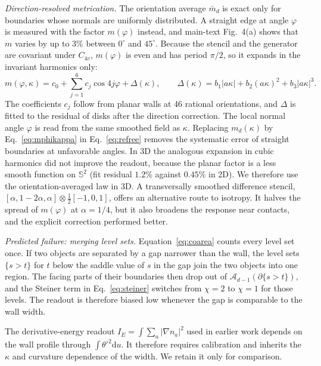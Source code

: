 \documentclass[11pt,a4paper]{article}
\newcommand{\dd}{\mathrm{d}}
\newcommand{\Sn}{\mathbb S}
\begin{document}
\emph{Direction-resolved metrication.} The orientation average $\bar m_d$ is exact only for boundaries whose normals are uniformly distributed. A straight edge at angle $\varphi$ is measured with the factor $m(\varphi)$ instead, and main-text Fig.~4(a) shows that $m$ varies by up to 3\% between $0^\circ$ and $45^\circ$. Because the stencil and the generator are covariant under $C_{4v}$, $m(\varphi)$ is even and has period $\pi/2$, so it expands in the invariant harmonics only:
\begin{equation}
 m(\varphi,\kappa)=c_0+\sum_{j=1}^{6}c_j\cos4j\varphi+\Delta(\kappa),\qquad \Delta(\kappa)=b_1|a\kappa|+b_2(a\kappa)^2+b_3|a\kappa|^3 .
 \label{eq:mphikappa}
\end{equation}
The coefficients $c_j$ follow from planar walls at 46 rational orientations, and $\Delta$ is fitted to the residual of disks after the direction correction. The local normal angle $\varphi$ is read from the same smoothed field as $\kappa$. Replacing $m_d(\kappa)$ by Eq.~\eqref{eq:mphikappa} in Eq.~\eqref{eq:refree} removes the systematic error of straight boundaries at unfavorable angles. In 3D the analogous expansion in cubic harmonics did not improve the readout, because the planar factor is a less smooth function on $\Sn^2$ (fit residual $1.2\%$ against $0.45\%$ in 2D). We therefore use the orientation-averaged law in 3D. A transversally smoothed difference stencil, $[\alpha,1-2\alpha,\alpha]\otimes\tfrac12[-1,0,1]$, offers an alternative route to isotropy. It halves the spread of $m(\varphi)$ at $\alpha=1/4$, but it also broadens the response near contacts, and the explicit correction performed better.

\emph{Predicted failure: merging level sets.} Equation~\eqref{eq:coarea} counts every level set once. If two objects are separated by a gap narrower than the wall, the level sets $\{s>t\}$ for $t$ below the saddle value of $s$ in the gap join the two objects into one region. The facing parts of their boundaries then drop out of $\mathcal A_{d-1}(\partial\{s>t\})$, and the Steiner term in Eq.~\eqref{eq:steiner} switches from $\chi=2$ to $\chi=1$ for those levels. The readout is therefore biased low whenever the gap is comparable to the wall width.

The derivative-energy readout $I_E=\int\sum_a|\nabla n_a|^2$ used in earlier work depends on the wall profile through $\int\theta'^2\dd u$. It therefore requires calibration and inherits the $\kappa$ and curvature dependence of the width. We retain it only for comparison.
\end{document}
